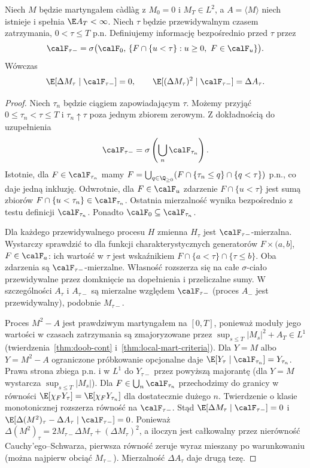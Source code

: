 \begin{twierdzenie}
\label{thm:predictable-jump-moments}
Niech $M$ będzie martyngałem c\`adl\`ag
z $M_0=0$ i $M_T\in L^2$, a $A=\langle M\rangle$
niech istnieje i spełnia $\E A_T<\infty$.
Niech $\tau$ będzie przewidywalnym czasem
zatrzymania, $0<\tau\le T$ p.n.
Definiujemy informację bezpośrednio przed $\tau$ przez
\[
\calF_{\tau-}=\sigma\bigl(\calF_0,\,
\{F\cap\{u<\tau\}:u\ge0,\ F\in\calF_u\}\bigr).
\]
Wówczas
\[
\E[\Delta M_\tau\mid\calF_{\tau-}]=0,\qquad
\E[(\Delta M_\tau)^2\mid\calF_{\tau-}]=\Delta A_\tau.
\]
\end{twierdzenie}
\begin{proof}
Niech $\tau_n$ będzie ciągiem zapowiadającym
$\tau$. Możemy przyjąć $0\le\tau_n<\tau\le T$
i $\tau_n\uparrow\tau$ poza jednym zbiorem
zerowym. Z dokładnością do uzupełnienia
\[
\calF_{\tau-}=\sigma\left(\bigcup_n\calF_{\tau_n}\right).
\]
Istotnie, dla $F\in\calF_{\tau_n}$ mamy
$F=\bigcup_{q\in\Q_{\ge0}}(F\cap\{\tau_n\le q\}
\cap\{q<\tau\})$ p.n., co daje jedną inkluzję.
Odwrotnie, dla $F\in\calF_u$ zdarzenie
$F\cap\{u<\tau\}$ jest sumą zbiorów
$F\cap\{u<\tau_n\}\in\calF_{\tau_n}$.
Ostatnia mierzalność wynika bezpośrednio
z testu definicji $\calF_{\tau_n}$.
Ponadto $\calF_0\subseteq\calF_{\tau_n}$.

Dla każdego przewidywalnego procesu $H$
zmienna $H_\tau$ jest $\calF_{\tau-}$-mierzalna.
Wystarczy sprawdzić to dla funkcji
charakterystycznych generatorów
$F\times(a,b]$, $F\in\calF_a$:
ich wartość w $\tau$ jest wskaźnikiem
$F\cap\{a<\tau\}\cap\{\tau\le b\}$.
Oba zdarzenia są $\calF_{\tau-}$-mierzalne.
Własność rozszerza się na całe $\sigma$-ciało
przewidywalne przez domknięcie na dopełnienia
i przeliczalne sumy. W szczególności
$A_\tau$ i $A_{\tau-}$ są mierzalne względem
$\calF_{\tau-}$ (proces $A_-$ jest przewidywalny),
podobnie $M_{\tau-}$.

Proces $M^2-A$ jest prawdziwym martyngałem
na $[0,T]$, ponieważ moduły jego wartości
w czasach zatrzymania są zmajoryzowane przez
$\sup_{s\le T}|M_s|^2+A_T\in L^1$
(twierdzenia~\ref{thm:doob-cont}
i~\ref{thm:local-mart-criteria}).
Dla $Y=M$ albo $Y=M^2-A$ ograniczone
próbkowanie opcjonalne daje
$\E[Y_\tau\mid\calF_{\tau_n}]=Y_{\tau_n}$.
Prawa strona zbiega p.n. i w $L^1$
do $Y_{\tau-}$ przez powyższą majorantę
(dla $Y=M$ wystarcza $\sup_{s\le T}|M_s|$).
Dla $F\in\bigcup_n\calF_{\tau_n}$
przechodzimy do granicy w równości
$\E[\chi_FY_\tau]=\E[\chi_FY_{\tau_n}]$
dla dostatecznie dużego $n$.
Twierdzenie o klasie monotonicznej rozszerza
równość na $\calF_{\tau-}$.
Stąd $\E[\Delta M_\tau\mid\calF_{\tau-}]=0$
i $\E[\Delta(M^2)_\tau-\Delta A_\tau
\mid\calF_{\tau-}]=0$.
Ponieważ
$\Delta(M^2)_\tau=2M_{\tau-}\Delta M_\tau+
(\Delta M_\tau)^2$,
a iloczyn jest całkowalny przez nierówność
Cauchy'ego--Schwarza, pierwsza równość
zeruje wyraz mieszany po warunkowaniu
(można najpierw obciąć $M_{\tau-}$).
Mierzalność $\Delta A_\tau$ daje drugą tezę.
\end{proof}

